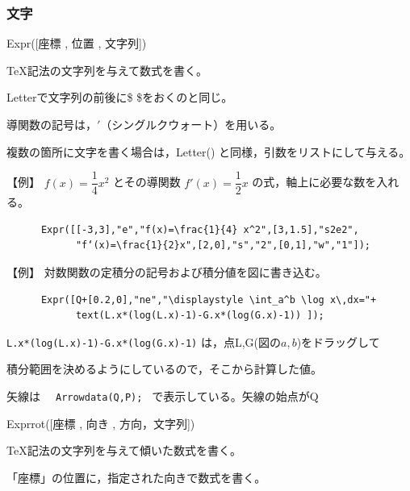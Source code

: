 \documentclass[papersize,a4paper,12pt,uplatex]{jsarticle}
\begin{document}
\subsubsection{文字}
\begin{description}

\vspace{\baselineskip}
\hypertarget{expr}{}
\item[関数]  Expr([座標 , 位置 , 文字列])
\item[機能]  \TeX 記法の文字列を与えて数式を書く。
\item[説明]  Letterで文字列の前後に\$ \$をおくのと同じ。

導関数の記号は，$'$（シングルクウォート）を用いる。

複数の箇所に文字を書く場合は，Letter() と同様，引数をリストにして与える。

\vspace{\baselineskip}
【例】  $f(x)=\dfrac{1}{4} x^2$  とその導関数 $f'(x)=\dfrac{1}{2} x$ の式，軸上に必要な数を入れる。
\begin{verbatim}
      Expr([[-3,3],"e","f(x)=\frac{1}{4} x^2",[3,1.5],"s2e2",
            "f‘(x)=\frac{1}{2}x",[2,0],"s","2",[0,1],"w","1"]);
\end{verbatim}
\vspace{\baselineskip}
          \begin{center} \end{center}

【例】  対数関数の定積分の記号および積分値を図に書き込む。
\begin{verbatim}
      Expr([Q+[0.2,0],"ne","\displaystyle \int_a^b \log x\,dx="+
            text(L.x*(log(L.x)-1)-G.x*(log(G.x)-1)) ]);
\end{verbatim}

 \verb|L.x*(log(L.x)-1)-G.x*(log(G.x)-1)| は，点L,G(図の$a,b$)をドラッグして
 
 積分範囲を決めるようにしているので，そこから計算した値。
 
 矢線は \verb|  Arrowdata(Q,P); | で表示している。矢線の始点がQ
\vspace{\baselineskip}
          \begin{center} \end{center}

\vspace{\baselineskip}
\hypertarget{exprrot}{}
\item[関数]  Exprrot([座標 , 向き , 方向，文字列])
\item[機能]  \TeX 記法の文字列を与えて傾いた数式を書く。
\item[説明]  「座標」の位置に，指定された向きで数式を書く。


\end{description}
\end{document}
